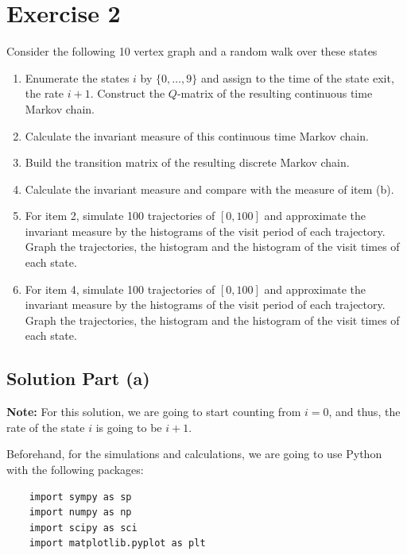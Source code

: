 
\section{Exercise 2}
Consider the following 10 vertex graph and a random walk over these states

\begin{center}
    
\end{center}

\begin{enumerate}[label=(\alph*)]
    \item Enumerate the states $i$ by $\{0,\ldots, 9\}$ and assign to the time of the state exit, the rate $i+1$. Construct the $Q$-matrix of the resulting continuous time Markov chain.
    \item Calculate the invariant measure of this continuous time Markov chain.
    \item Build the transition matrix of the resulting discrete Markov chain.
    \item Calculate the invariant measure and compare with the measure of item (b).
    \item For item 2, simulate 100 trajectories of $[0,100]$ and approximate the invariant measure by the histograms of the visit period of each trajectory. Graph the trajectories, the histogram and the histogram of the visit times of each state.
    \item For item 4, simulate 100 trajectories of $[0,100]$ and approximate the invariant measure by the histograms of the visit period of each trajectory. Graph the trajectories, the histogram and the histogram of the visit times of each state.
\end{enumerate}

\subsection*{Solution Part (a)}

\textbf{Note:} For this solution, we are going to start counting from $i = 0$, and thus, the rate of the state $i$ is going to be $i+1$.

Beforehand, for the simulations and calculations, we are going to use Python with the following packages:

\begin{verbatim}
    import sympy as sp
    import numpy as np
    import scipy as sci
    import matplotlib.pyplot as plt
\end{verbatim}

